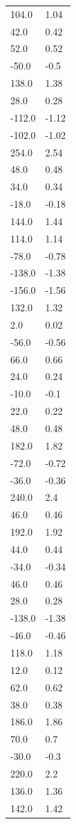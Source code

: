 \begin{longtable}{ll}
104.0 & 1.04 \\
42.0 & 0.42 \\
52.0 & 0.52 \\
-50.0 & -0.5 \\
138.0 & 1.38 \\
28.0 & 0.28 \\
-112.0 & -1.12 \\
-102.0 & -1.02 \\
254.0 & 2.54 \\
48.0 & 0.48 \\
34.0 & 0.34 \\
-18.0 & -0.18 \\
144.0 & 1.44 \\
114.0 & 1.14 \\
-78.0 & -0.78 \\
-138.0 & -1.38 \\
-156.0 & -1.56 \\
132.0 & 1.32 \\
2.0 & 0.02 \\
-56.0 & -0.56 \\
66.0 & 0.66 \\
24.0 & 0.24 \\
-10.0 & -0.1 \\
22.0 & 0.22 \\
48.0 & 0.48 \\
182.0 & 1.82 \\
-72.0 & -0.72 \\
-36.0 & -0.36 \\
240.0 & 2.4 \\
46.0 & 0.46 \\
192.0 & 1.92 \\
44.0 & 0.44 \\
-34.0 & -0.34 \\
46.0 & 0.46 \\
28.0 & 0.28 \\
-138.0 & -1.38 \\
-46.0 & -0.46 \\
118.0 & 1.18 \\
12.0 & 0.12 \\
62.0 & 0.62 \\
38.0 & 0.38 \\
186.0 & 1.86 \\
70.0 & 0.7 \\
-30.0 & -0.3 \\
220.0 & 2.2 \\
136.0 & 1.36 \\
142.0 & 1.42 \\

\end{longtable}
